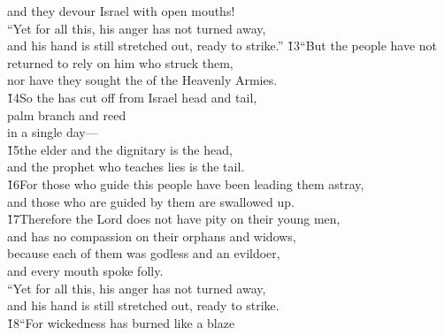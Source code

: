 \begin{poetry}
\poeml and they devour Israel with open mouths! \\
\poeml ``Yet for all this, his anger has not turned away, \\
\poemll    and his hand is still stretched out, ready to strike.''
\poeml \v{13}``But the people have not returned to rely on him who struck them, \\
\poemll    nor have they sought the  of the Heavenly Armies. \\
\poeml \v{14}So the  has cut off from Israel head and tail, \\
\poemll    palm branch and reed \\
\poemlll       in a single day--- \\
\poeml \v{15}the elder and the dignitary is the head, \\
\poemll    and the prophet who teaches lies is the tail. \\
\poeml \v{16}For those who guide this people have been leading them astray, \\
\poemll    and those who are guided by them are swallowed up. \\
\poeml \v{17}Therefore the Lord does not have pity on their young men, \\
\poemll    and has no compassion on their orphans and widows, \\
\poeml because each of them was godless and an evildoer, \\
\poemll    and every mouth spoke folly. \\
\poeml ``Yet for all this, his anger has not turned away, \\
\poemll    and his hand is still stretched out, ready to strike. \\
\poeml \v{18}``For wickedness has burned like a blaze \\

\end{poetry}
